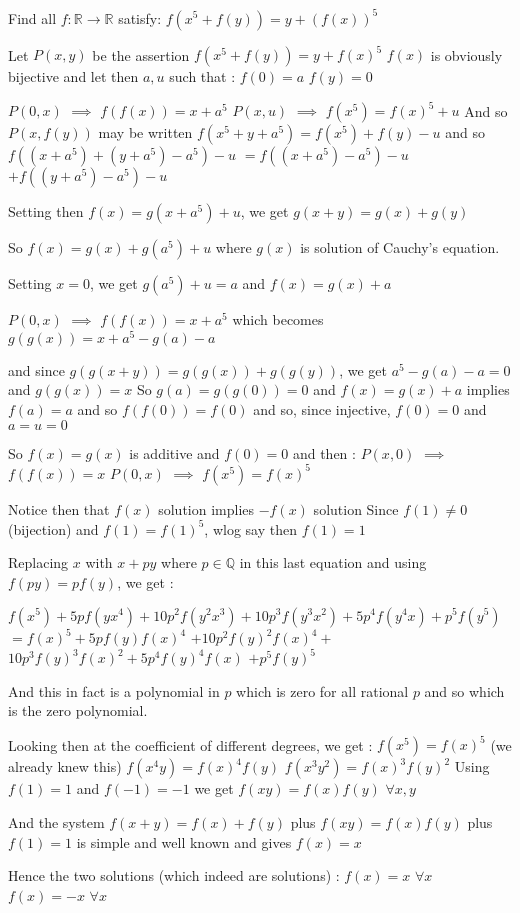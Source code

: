 \begin{solution}
	\begin{tcolorbox}Find all $f:\mathbb{R}\rightarrow \mathbb{R}$ satisfy:
$f(x^5+f(y))=y+(f(x))^5$\end{tcolorbox}
Let $P(x,y)$ be the assertion $f(x^5+f(y))=y+f(x)^5$
$f(x)$ is obviously bijective and let then $a,u$ such that :
$f(0)=a$
$f(y)=0$

$P(0,x)$ $\implies$ $f(f(x))=x+a^5$
$P(x,u)$ $\implies$ $f(x^5)=f(x)^5+u$
And so $P(x,f(y))$ may be written $f(x^5+y+a^5)=f(x^5)+f(y)-u$ and so $f((x+a^5)+(y+a^5)-a^5)-u$ $=f((x+a^5)-a^5)-u$ $+f((y+a^5)-a^5)-u$

Setting then $f(x)=g(x+a^5)+u$, we get $g(x+y)=g(x)+g(y)$

So $f(x)=g(x)+g(a^5)+u$ where $g(x)$ is solution of Cauchy's equation.

Setting $x=0$, we get $g(a^5)+u=a$ and $f(x)=g(x)+a$

$P(0,x)$ $\implies$ $f(f(x))=x+a^5$ which becomes $g(g(x))=x+a^5-g(a)-a$


and since $g(g(x+y))=g(g(x))+g(g(y))$, we get $a^5-g(a)-a=0$ and $g(g(x))=x$
So $g(a)=g(g(0))=0$ and $f(x)=g(x)+a$ implies $f(a)=a$ and so $f(f(0))=f(0)$ and so, since injective, $f(0)=0$ and $a=u=0$

So $f(x)=g(x)$ is additive and $f(0)=0$ and then :
$P(x,0)$ $\implies$ $f(f(x))=x$
$P(0,x)$ $\implies$ $f(x^5)=f(x)^5$

Notice then that $f(x)$ solution implies $-f(x)$ solution
Since $f(1)\ne 0$ (bijection) and $f(1)=f(1)^5$, wlog say then $f(1)=1$

Replacing $x$ with $x+py$ where $p\in\mathbb Q$ in this last equation and using $f(py)=pf(y)$, we get :

$f(x^5)+5pf(yx^4)+10p^2f(y^2x^3)+10p^3f(y^3x^2)+5p^4f(y^4x)+p^5f(y^5)$ $=f(x)^5+5pf(y)f(x)^4$ $+10p^2f(y)^2f(x)^4+$ $10p^3f(y)^3f(x)^2+5p^4f(y)^4f(x)$ $+p^5f(y)^5$

And this in fact is a polynomial in $p$ which is zero for all rational $p$ and so which is the zero polynomial.

Looking then at the coefficient of different degrees, we get :
$f(x^5)=f(x)^5$ (we already knew this)
$f(x^4y)=f(x)^4f(y)$
$f(x^3y^2)=f(x)^3f(y)^2$
Using $f(1)=1$ and $f(-1)=-1$ we get $f(xy)=f(x)f(y)$ $\forall x,y$

And the system $f(x+y)=f(x)+f(y)$ plus $f(xy)=f(x)f(y)$ plus $f(1)=1$ is simple and well known and gives $f(x)=x$

Hence the two solutions (which indeed are solutions) :
$f(x)=x$ $\forall x$
$f(x)=-x$ $\forall x$
\end{solution}



